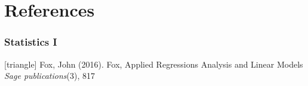 \documentclass[xcolor=table]{beamer}
\begin{document}
\appendix

\section{References}
\begin{frame}
	\frametitle{Statistics I}
	\footnotesize{
		\begin{thebibliography}{99}
			[triangle]
			 Fox, John (2016).
			\newblock Fox, Applied Regressions Analysis and Linear Models
			\newblock \textit{Sage publications}(3), 817
		\end{thebibliography}
	}
\end{frame}

\end{document}
